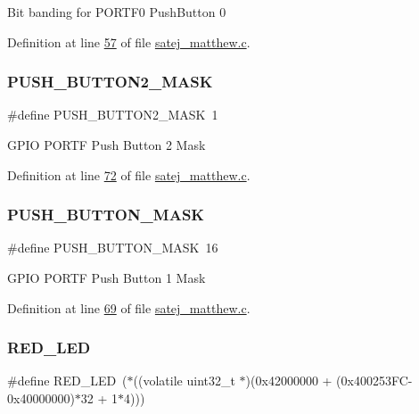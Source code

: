 Bit banding for P\+O\+R\+T\+F0 Push\+Button 0 

Definition at line \mbox{\hyperlink{satej__matthew_8c_source_l00057}{57}} of file \mbox{\hyperlink{satej__matthew_8c_source}{satej\+\_\+matthew.\+c}}.

\mbox{\label{satej__matthew_8c_a061bf1fc7521f6b5d85598f063e87c30}} 
\subsubsection{\texorpdfstring{PUSH\_BUTTON2\_MASK}{PUSH\_BUTTON2\_MASK}}
{\footnotesize\ttfamily \#define P\+U\+S\+H\+\_\+\+B\+U\+T\+T\+O\+N2\+\_\+\+M\+A\+SK~1}

G\+P\+IO P\+O\+R\+TF Push Button 2 Mask 

Definition at line \mbox{\hyperlink{satej__matthew_8c_source_l00072}{72}} of file \mbox{\hyperlink{satej__matthew_8c_source}{satej\+\_\+matthew.\+c}}.

\mbox{\label{satej__matthew_8c_aa39095336c165058ffd24cc58287f407}} 
\subsubsection{\texorpdfstring{PUSH\_BUTTON\_MASK}{PUSH\_BUTTON\_MASK}}
{\footnotesize\ttfamily \#define P\+U\+S\+H\+\_\+\+B\+U\+T\+T\+O\+N\+\_\+\+M\+A\+SK~16}

G\+P\+IO P\+O\+R\+TF Push Button 1 Mask 

Definition at line \mbox{\hyperlink{satej__matthew_8c_source_l00069}{69}} of file \mbox{\hyperlink{satej__matthew_8c_source}{satej\+\_\+matthew.\+c}}.

\mbox{\label{satej__matthew_8c_a073dbcb7f5bc4f4b45dc048b55eaff3d}} 
\subsubsection{\texorpdfstring{RED\_LED}{RED\_LED}}
{\footnotesize\ttfamily \#define R\+E\+D\+\_\+\+L\+ED~($\ast$((volatile uint32\+\_\+t $\ast$)(0x42000000 + (0x400253\+F\+C-\/0x40000000)$\ast$32 + 1$\ast$4)))}

